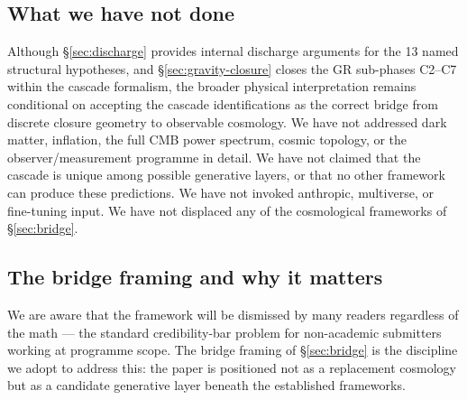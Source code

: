 \documentclass[11pt]{article}
\theoremstyle{plain}
\theoremstyle{definition}
\theoremstyle{remark}
\begin{document}
\subsection{What we have not done}

Although \S\ref{sec:discharge} provides internal discharge arguments for the 13 named structural hypotheses, and \S\ref{sec:gravity-closure} closes the GR sub-phases C2--C7 within the cascade formalism, the broader physical interpretation remains conditional on accepting the cascade identifications as the correct bridge from discrete closure geometry to observable cosmology. We have not addressed dark matter, inflation, the full CMB power spectrum, cosmic topology, or the observer/measurement programme in detail. We have not claimed that the cascade is unique among possible generative layers, or that no other framework can produce these predictions. We have not invoked anthropic, multiverse, or fine-tuning input. We have not displaced any of the cosmological frameworks of \S\ref{sec:bridge}.

\subsection{The bridge framing and why it matters}

We are aware that the framework will be dismissed by many readers regardless of the math --- the standard credibility-bar problem for non-academic submitters working at programme scope. The bridge framing of \S\ref{sec:bridge} is the discipline we adopt to address this: the paper is positioned not as a replacement cosmology but as a candidate generative layer beneath the established frameworks.
\end{document}
